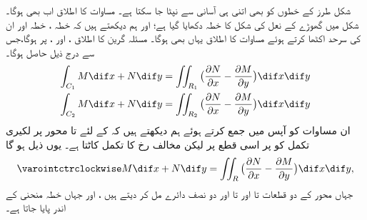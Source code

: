  شکل     طرز کے خطوں کو بھی اتنی ہی  آسانی  سے نپٹا جا سکتا ہے۔ مساوات     کا اطلاق اب بھی ہوگا۔ شکل      میں گھوڑے کے نعل کی شکل کا خطہ  دکھایا گیا ہے؛  اور ہم دیکھتے  ہیں کہ خطہ  ، خطہ   اور ان کی سرحد اکٹھا کرتے ہوئے مساوات      کا اطلاق یہاں بھی ہوگا۔  مسئلہ  گرین کا اطلاق   ،  اور ،   پر  ہوگا،جس سے درج ذیل حاصل ہوگا۔ 
\begin{align*}
\int_{C_1}M \dif x+N \dif y&=\iint_{R_1}\big(\frac{\partial N}{\partial x}-\frac{\partial M}{\partial y}\big) \dif x \dif y \\     
\int_{C_2} M \dif x + N \dif y &= \iint_{R_2} \big(\frac{\partial N}{\partial x} - \frac{\partial M}{\partial y}\big) \dif x \dif y 
\end{align*}
 ان  مساوات کو آپس میں جمع کرتے ہوئے ہم دیکھتے ہیں کہ   کے لئے   تا     محور  پر لکیری تکمل کو  پر اسی قطع  پر   لیکن مخالف رخ کا تکمل کاٹتا ہے۔ یوں   ذیل ہو گا
\begin{align*}
\varointctrclockwise M \dif x + N \dif y = \iint_R \big(\frac{\partial N}{\partial x} 
- \frac{\partial M}{\partial y}\big) \dif x \dif y, 
\end{align*}
 جہاں    محور کے دو قطعات    تا  اور  تا  اور دو نصف دائرے مل کر  دیتے ہیں ،  اور  جہاں خطہ   منحنی   کے اندر پایا جاتا ہے۔
 
